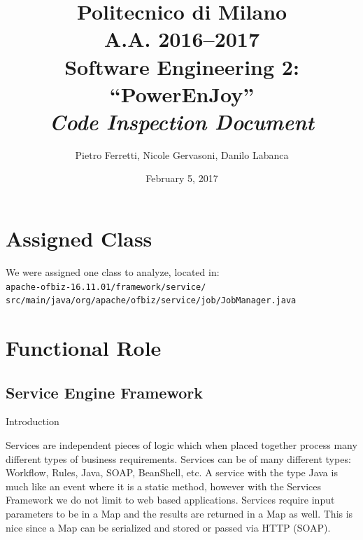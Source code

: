 \documentclass[english]{article}
\begin{document}
\title{Politecnico di Milano\\
 A.A. 2016–2017 \\
Software Engineering 2: “PowerEnJoy” \\
\emph{\textbf{Code Inspection Document}}}

\author{Pietro Ferretti, Nicole Gervasoni, Danilo Labanca}
\date{February 5, 2017}
\maketitle

\newpage

\tableofcontents{}

\newpage

\section{Assigned Class}
We were assigned one class to analyze, located in:\\

\texttt{apache-ofbiz-16.11.01/framework/service/\\
\hspace*{1cm}src/main/java/org/apache/ofbiz/service/job/JobManager.java}

\section{Functional Role}%

\subsection{Service Engine Framework}
Introduction

Services are independent pieces of logic which when placed together process many different types of business requirements. Services can be of many different types: Workflow, Rules, Java, SOAP, BeanShell, etc. A service with the type Java is much like an event where it is a static method, however with the Services Framework we do not limit to web based applications. Services require input parameters to be in a Map and the results are returned in a Map as well. This is nice since a Map can be serialized and stored or passed via HTTP (SOAP).
\end{document}
